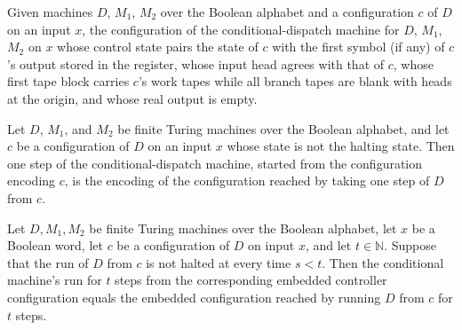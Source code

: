 \begin{definition}
\label{Turing.FinTM.controlCfg}
\leanok
{}
Given machines $D$, $M_1$, $M_2$ over the Boolean alphabet and a configuration
$c$ of $D$ on an input $x$, the configuration of the conditional-dispatch
machine for $D$, $M_1$, $M_2$ on $x$ whose control state pairs the state of
$c$ with the first symbol (if any) of $c$'s output stored in the register,
whose input head agrees with that of $c$, whose first tape block carries $c$'s
work tapes while all branch tapes are blank with heads at the origin, and
whose real output is empty.
\end{definition}

\begin{lemma}
\label{Turing.FinTM.controlCfg_step}
\leanok
{}
Let $D$, $M_1$, and $M_2$ be finite Turing machines over the Boolean alphabet, and let
$c$ be a configuration of $D$ on an input $x$ whose state is not the halting state. Then
one step of the conditional-dispatch machine, started from the configuration encoding
$c$, is the encoding of the configuration reached by taking one step of $D$ from $c$.
\end{lemma}

\begin{lemma}
\label{Turing.FinTM.controlCfg_run}
\leanok
{}
Let $D,M_1,M_2$ be finite Turing machines over the Boolean alphabet, let $x$ be a
Boolean word, let $c$ be a configuration of $D$ on input $x$, and let $t\in\mathbb{N}$.
Suppose that the run of $D$ from $c$ is not halted at every time $s<t$. Then the
conditional machine's run for $t$ steps from the corresponding embedded controller
configuration equals the embedded configuration reached by running $D$ from $c$ for $t$
steps.
\end{lemma}

